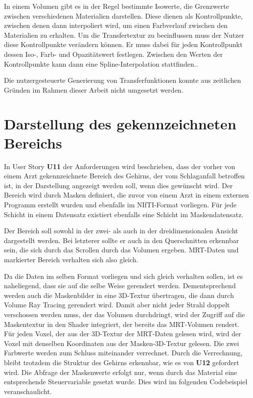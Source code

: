 In einem Volumen gibt es in der Regel bestimmte Isowerte, die Grenzwerte zwischen verschiedenen Materialien darstellen. Diese dienen als Kontrollpunkte, zwischen denen dann interpoliert wird, um einen Farbverlauf zwischen den Materialien zu erhalten. 
Um die Transfertextur zu beeinflussen muss der Nutzer diese Kontrollpunkte verändern können. Er muss dabei für jeden Kontrollpunkt dessen Iso-, Farb- und Opazitätswert festlegen. Zwischen den Werten der Kontrollpunkte kann dann eine Spline-Interpolation stattfinden.. 

Die nutzergesteuerte Generierung von Transferfunktionen konnte aus zeitlichen Gründen im Rahmen dieser Arbeit nicht umgesetzt werden.


\section{Darstellung des gekennzeichneten Bereichs}
\label{maske}


In User Story \textbf{U11} der Anforderungen wird beschrieben, dass der vorher von einem Arzt gekennzeichnete Bereich des Gehirns, der vom Schlaganfall betroffen ist, in der Darstellung angezeigt werden soll, wenn dies gewünscht wird. 
Der Bereich wird durch Masken definiert, die zuvor von einem Arzt in einem externen Programm erstellt wurden und ebenfalls im NIfTI-Format vorliegen. Für jede Schicht in einem Datensatz existiert ebenfalls eine Schicht im Maskendatensatz. 

Der Bereich soll sowohl in der zwei- als auch in der dreidimensionalen Ansicht dargestellt werden. Bei letzterer sollte er auch in den Querschnitten erkennbar sein, die sich durch das Scrollen durch das Volumen ergeben. MRT-Daten und markierter Bereich verhalten sich also gleich.

Da die Daten im selben Format vorliegen und sich gleich verhalten sollen, ist es naheliegend, dass sie auf die selbe Weise gerendert werden. Dementsprechend werden auch die Maskenbilder in eine 3D-Textur übertragen, die dann durch Volume Ray Tracing gerendert wird. Damit aber nicht jeder Strahl doppelt verschossen werden muss, der das Volumen durchdringt, wird der Zugriff auf die Maskentextur in den Shader integriert, der bereits das MRT-Volumen rendert. Für jeden Voxel, der aus der 3D-Textur der MRT-Daten gelesen wird, wird  der Voxel mit denselben Koordinaten aus der Masken-3D-Textur gelesen. Die zwei Farbwerte werden zum Schluss miteinander verrechnet. Durch die Verrechnung, bleibt trotzdem die Struktur des Gehirns erkennbar, wie es von \textbf{U12} gefordert wird. Die Abfrage der Maskenwerte erfolgt nur, wenn durch das Material eine entsprechende Steuervariable gesetzt wurde.
Dies wird im folgenden Codebeispiel veranschaulicht.

